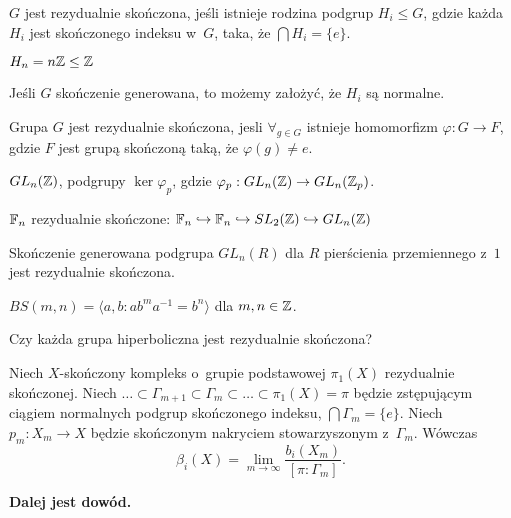 \begin{definicja}
	$G$ jest rezydualnie skończona, 
	jeśli istnieje rodzina podgrup $H_i \leq G$,
	gdzie każda $H_i$ jest skończonego indeksu w~$G$, 
	taka, że $\bigcap H_i = \{ e \}$.
\end{definicja}

\begin{przyklad}
	$H_n = n {\mathbb{Z}} \leq {\mathbb{Z}}$
\end{przyklad}

\begin{uwaga}
	Jeśli $G$ skończenie generowana,
	to możemy założyć, że $H_i$ są normalne.
\end{uwaga}

\begin{wniosek}
	Grupa $G$ jest rezydualnie skończona, jesli
	$\forall_{g \in G}$ istnieje homomorfizm
	${\varphi: G \to F}$, gdzie $F$ jest grupą skończoną
	taką, że $\varphi(g) \neq e$.
\end{wniosek}

\begin{przyklad}
	$GL_n({\mathbb{Z}})$, podgrupy $\ker \varphi_p$, gdzie 
	$\varphi_p : GL_n({\mathbb{Z}}) \to GL_n({\mathbb{Z}}_p)$.
\end{przyklad}

\begin{przyklad}
	${\mathbb{F}}_n$ rezydualnie skończone: ${\mathbb{F}}_n 
	\hookrightarrow {\mathbb{F}}_n
	\hookrightarrow SL_2({\mathbb{Z}})
	\hookrightarrow GL_n({\mathbb{Z}})$
\end{przyklad}

\begin{twierdzenie}[Malcer]
	Skończenie generowana podgrupa $GL_n(R)$
	dla $R$ pierścienia przemiennego z~$1$
	jest rezydualnie skończona.
\end{twierdzenie}

\begin{przyklad}
	$BS(m,n) = \langle a, b: a b^m a^{-1} = b^n \rangle$ dla $m, n \in {\mathbb{Z}}$.
\end{przyklad}

\begin{hipoteza}
	Czy każda grupa hiperboliczna jest rezydualnie skończona?
\end{hipoteza}

\begin{twierdzenie}
	Niech $X$-skończony kompleks o~grupie podstawowej $\pi_1(X)$
	rezydualnie skończonej. Niech $\ldots \subset \Gamma_{m+1}
	\subset \Gamma_m \subset \ldots \subset \pi_1(X) = \pi$
	będzie zstępującym ciągiem normalnych podgrup skończonego indeksu,
	$\bigcap \Gamma_m = \{ e \}$.
	Niech $p_m : X_m \to X$ będzie skończonym nakryciem
	stowarzyszonym z~$\Gamma_m$.
	Wówczas $$\beta_i(X) 
	= \lim_{m \to \infty} \frac{b_i(X_m)}{[\pi : \Gamma_m]}.$$
\end{twierdzenie}

{\bf Dalej jest dowód.}





